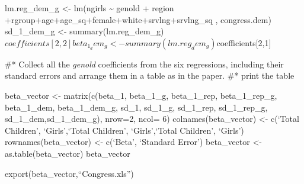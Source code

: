 \documentclass[
]{article}
\begin{document}
lm.reg\_dem\_g \textless- lm(ngirls \textasciitilde{} genold + region
+rgroup+age+age\_sq+female+white+srvlng+srvlng\_sq , congress.dem)
sd\_1\_dem\_g \textless-
summary(lm.reg\_dem\_g)\(coefficients[2,2] beta_1_dem_g <- summary(lm.reg_dem_g)\)coefficients{[}2,1{]}

\#* Collect all the \emph{genold} coefficients from the six regressions,
including their standard errors and arrange them in a table as in the
paper. \#* print the table

beta\_vector \textless- matrix(c(beta\_1, beta\_1\_g, beta\_1\_rep,
beta\_1\_rep\_g, beta\_1\_dem, beta\_1\_dem\_g, sd\_1, sd\_1\_g,
sd\_1\_rep, sd\_1\_rep\_g, sd\_1\_dem,sd\_1\_dem\_g), nrow=2, ncol= 6)
colnames(beta\_vector) \textless- c(`Total Children', `Girls',`Total
Children', `Girls',`Total Children', `Girls') rownames(beta\_vector)
\textless- c(`Beta', `Standard Error') beta\_vector \textless-
as.table(beta\_vector) beta\_vector

export(beta\_vector,``Congress.xls'')
\end{document}
